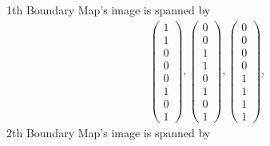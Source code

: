 \documentclass[8pt]{article}
\begin{document}
\centering
1th Boundary Map's image is spanned by
 \begin{align*} \left(\begin{array}{r}
1 \\
1 \\
0 \\
0 \\
0 \\
1 \\
0 \\
1
\end{array}\right) ,
 \left(\begin{array}{r}
0 \\
0 \\
1 \\
1 \\
0 \\
1 \\
0 \\
1
\end{array}\right) ,
 \left(\begin{array}{r}
0 \\
0 \\
0 \\
0 \\
1 \\
1 \\
1 \\
1
\end{array}\right) ,
 \end{align*}
 2th Boundary Map's image is spanned by
\end{document}
